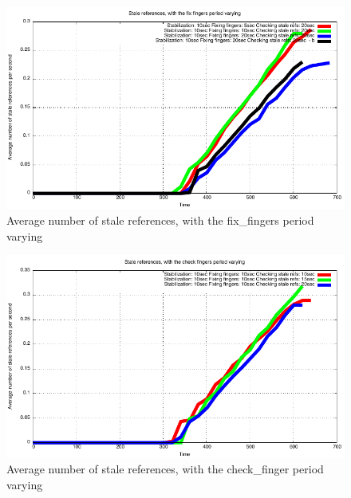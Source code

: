 \message{ !name(LSDS_project2_hayezl.tex)}\documentclass[a4paper, 11pt]{article}
\theoremstyle{plain}
\theoremstyle{definition}
\begin{document}
    
    \begin{figure}[h]
      \centering
      \includegraphics{plots/Average-SR-fix-fingers.pdf}
      \caption{Average number of stale references, with the fix\_fingers period varying}
      \label{fig:Av-SR-fix-fingers}
    \end{figure}
    
    
    \begin{figure}[h]
      \centering
      \includegraphics{plots/Average-SR-check-finger.pdf}
      \caption{Average number of stale references, with the check\_finger period varying}
      \label{fig:Av-SR-check-finger}
    \end{figure}
\end{document}
